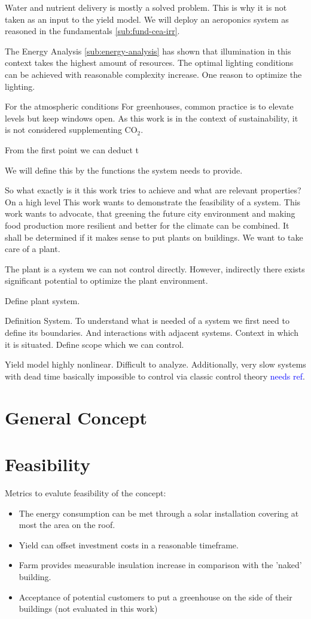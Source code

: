 Water and nutrient delivery is mostly a solved problem.
This is why it is not taken as an input to the yield model.
We will deploy an aeroponics system as reasoned in the fundamentals \ref{sub:fund-cea-irr}.

The Energy Analysis \ref{sub:energy-analysis} has shown that illumination in this context takes the highest amount of resources.
The optimal lighting conditions can be achieved with reasonable complexity increase.
One reason to optimize the lighting.

For the atmospheric conditions
For greenhouses, common practice is to elevate levels but keep windows open.
As this work is in the context of sustainability, it is not considered supplementing CO$_2$.

From the first point we can deduct t

We will define this by the functions the system needs to provide.

So what exactly is it this work tries to achieve and what are relevant properties?
On a high level
This work wants to demonstrate the feasibility of a system.
This work wants to advocate, that greening the future city environment and making food production more resilient and better for the climate can be combined.
It shall be determined if it makes sense to put plants on buildings.
We want to take care of a plant.

The plant is a system we can not control directly.
However, indirectly there exists significant potential to optimize the plant environment.

Define plant system.

Definition System.
To understand what is needed of a system we first need to define its boundaries.
And interactions with adjacent systems.
Context in which it is situated.
Define scope which we can control.

Yield model highly nonlinear.
Difficult to analyze.
Additionally, very slow systems with dead time basically impossible to control via classic control theory \textcolor{Blue}{needs ref}.



\section{General Concept}
\label{sec:concept}
\section{Feasibility}
\label{sec:feasibility}
Metrics to evalute feasibility of the concept:
\begin{itemize}
	\item The energy consumption can be met through a solar installation covering at most the area on the roof.
	\item Yield can offset investment costs in a reasonable timeframe.
	\item Farm provides measurable insulation increase in comparison with the 'naked' building.
	\item Acceptance of potential customers to put a greenhouse on the side of their buildings (not evaluated in this work)
\end{itemize}

